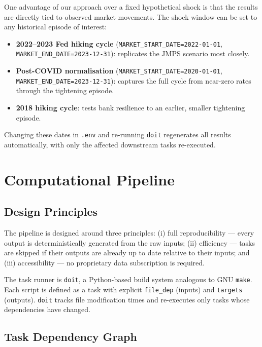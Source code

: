 \documentclass[12pt, a4paper]{article}
\begin{document}
One advantage of our approach over a fixed hypothetical shock is that the results
are directly tied to observed market movements. The shock window can be set to any
historical episode of interest:

\begin{itemize}[noitemsep]
    \item \textbf{2022--2023 Fed hiking cycle} (\texttt{MARKET\_START\_DATE=2022-01-01},
    \texttt{MARKET\_END\_DATE=2023-12-31}): replicates the JMPS scenario most closely.
    \item \textbf{Post-COVID normalisation} (\texttt{MARKET\_START\_DATE=2020-01-01},
    \texttt{MARKET\_END\_DATE=2023-12-31}): captures the full cycle from near-zero
    rates through the tightening episode.
    \item \textbf{2018 hiking cycle}: tests bank resilience to an earlier, smaller
    tightening episode.
\end{itemize}

Changing these dates in \texttt{.env} and re-running \texttt{doit} regenerates
all results automatically, with only the affected downstream tasks re-executed.

\section{Computational Pipeline}
\label{sec:pipeline}

\subsection{Design Principles}

The pipeline is designed around three principles: (i) full reproducibility ---
every output is deterministically generated from the raw inputs; (ii) efficiency
--- tasks are skipped if their outputs are already up to date relative to their
inputs; and (iii) accessibility --- no proprietary data subscription is required.

The task runner is \texttt{doit}, a Python-based build system analogous to GNU
\texttt{make}. Each script is defined as a task with explicit \texttt{file\_dep}
(inputs) and \texttt{targets} (outputs). \texttt{doit} tracks file modification
times and re-executes only tasks whose dependencies have changed.

\subsection{Task Dependency Graph}
\end{document}

